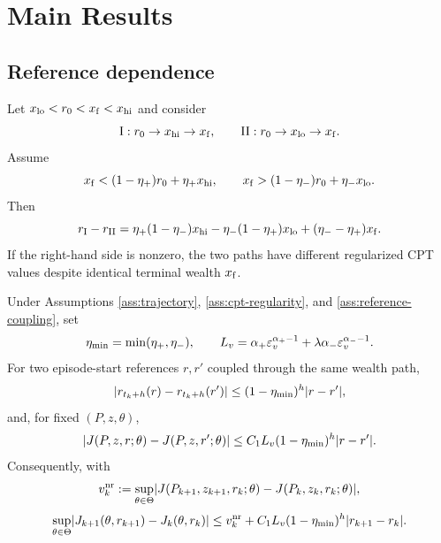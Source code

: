 \section{Main Results}\label{sec:results}

\subsection{Reference dependence}

\begin{proposition}\label{prop:path-dependence}
Let $x_{\rm lo}<r_0<x_{\rm f}<x_{\rm hi}$ and consider
\[
 \mathrm{I}: r_0\to x_{\rm hi}\to x_{\rm f},
 \qquad
 \mathrm{II}: r_0\to x_{\rm lo}\to x_{\rm f}.
\]
Assume
\[
 x_{\rm f}<(1-\eta_{+})r_0+\eta_{+} x_{\rm hi},
 \qquad
 x_{\rm f}>(1-\eta_{-})r_0+\eta_{-} x_{\rm lo}.
\]
Then
\begin{equation}\label{eq:path-reference-gap}
 r_{\rm I}-r_{\rm II}
 =\eta_{+}(1-\eta_{-})x_{\rm hi}
 -\eta_{-}(1-\eta_{+})x_{\rm lo}
 +(\eta_{-}-\eta_{+})x_{\rm f}.
\end{equation}
If the right-hand side is nonzero, the two paths have different regularized CPT values despite identical terminal wealth $x_{\rm f}$.
\end{proposition}

\begin{proposition}\label{prop:reference-sensitivity}
Under Assumptions \ref{ass:trajectory}, \ref{ass:cpt-regularity}, and \ref{ass:reference-coupling}, set
\begin{equation}\label{eq:reference-constants}
 \eta_{\min}=\min(\eta_{+},\eta_{-}),
 \qquad
 L_v=\alpha_+\varepsilon_v^{\alpha_+-1}
 +\lambda\alpha_-\varepsilon_v^{\alpha_--1}.
\end{equation}
For two episode-start references $r,r'$ coupled through the same wealth path,
\begin{equation}\label{eq:reference-contraction}
 \lvert r_{t_k+h}(r)-r_{t_k+h}(r')\rvert
 \le(1-\eta_{\min})^h\lvert r-r'\rvert,
\end{equation}
and, for fixed $(P,z,\theta)$,
\begin{equation}\label{eq:reference-value-sensitivity}
 \lvert J(P,z,r;\theta)-J(P,z,r';\theta)\rvert
 \le C_1L_v(1-\eta_{\min})^h\lvert r-r'\rvert.
\end{equation}
Consequently, with
\[
 v_k^{\rm nr}
 :=\sup_{\theta\in\Theta}
 \lvert J(P_{k+1},z_{k+1},r_k;\theta)-J(P_k,z_k,r_k;\theta)\rvert,
\]
\begin{equation}\label{eq:variation-decomposition}
 \sup_{\theta\in\Theta}
 \lvert J_{k+1}(\theta,r_{k+1})-J_k(\theta,r_k)\rvert
 \le v_k^{\rm nr}
 +C_1L_v(1-\eta_{\min})^h\lvert r_{k+1}-r_k\rvert.
\end{equation}
\end{proposition}

